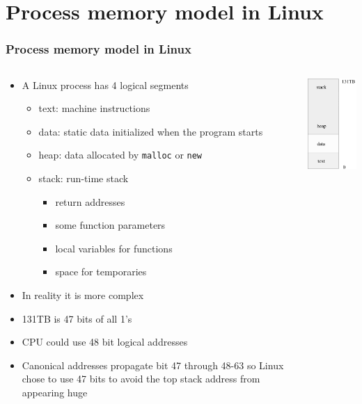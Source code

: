 \documentclass{beamer}
\begin{document}
\section{Process memory model in Linux}
\begin{frame}
    \frametitle{Process memory model in Linux}
    \begin{columns}
        \begin{column}[l]{3.5in}
            \begin{itemize}
                \item A Linux process has 4 logical segments
                \begin{itemize}
                    \item text: machine instructions
                    \item data: static data initialized when the program starts
                    \item heap: data allocated by {\tt malloc} or {\tt new}
                    \item stack: run-time stack
                    \begin{itemize}
                        \item return addresses
                        \item some function parameters
                        \item local variables for functions
                        \item space for temporaries
                    \end{itemize}
                \end{itemize}
                \item In reality it is more complex
                \item 131TB is 47 bits of all 1's
                \item CPU could use 48 bit logical addresses
                \item Canonical addresses propagate bit 47 through 48-63 so Linux chose to use 47 bits to avoid the top stack address from appearing huge
            \end{itemize}
        \end{column}
        \begin{column}[r]{3in}
            \includegraphics[width=1.5in]{process_memory.pdf}
        \end{column}
    \end{columns}
\end{frame}
\end{document}
